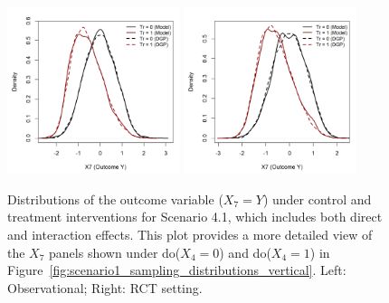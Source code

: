 \begin{figure}[htbp]
\centering
\includegraphics[width=0.45\textwidth]{img/results/observ_scenario1_X7_treatment_densities.png}
\includegraphics[width=0.45\textwidth]{img/results/rct_scenario1_X7_treatment_densities.png}
\caption{Distributions of the outcome variable ($X_7=Y$) under control and treatment interventions for Scenario 4.1, which includes both direct and interaction effects. This plot provides a more detailed view of the $X_7$ panels shown under do($X_4=0$) and do($X_4=1$) in Figure~\ref{fig:scenario1_sampling_distributions_vertical}. Left: Observational; Right: RCT setting.}
\label{fig:scenario1_outcome_distributions}
\end{figure}




